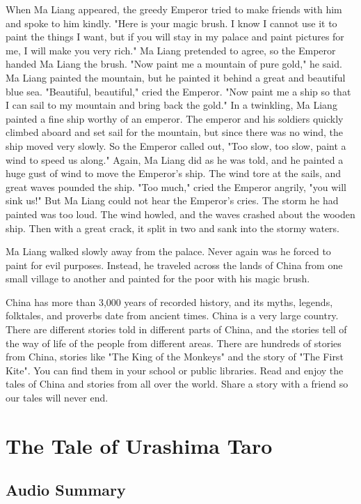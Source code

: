 When Ma Liang appeared, the greedy Emperor tried to make friends with him and spoke to him kindly. "Here is your magic brush. I know I cannot use it to paint the things I want, but if you will stay in my palace and paint pictures for me, I will make you very rich." Ma Liang pretended to agree, so the Emperor handed Ma Liang the brush. "Now paint me a mountain of pure gold," he said. Ma Liang painted the mountain, but he painted it behind a great and beautiful blue sea. "Beautiful, beautiful," cried the Emperor. "Now paint me a ship so that I can sail to my mountain and bring back the gold." In a twinkling, Ma Liang painted a fine ship worthy of an emperor. The emperor and his soldiers quickly climbed aboard and set sail for the mountain, but since there was no wind, the ship moved very slowly. So the Emperor called out, "Too slow, too slow, paint a wind to speed us along." Again, Ma Liang did as he was told, and he painted a huge gust of wind to move the Emperor's ship. The wind tore at the sails, and great waves pounded the ship. "Too much," cried the Emperor angrily, "you will sink us!" But Ma Liang could not hear the Emperor's cries. The storm he had painted was too loud. The wind howled, and the waves crashed about the wooden ship. Then with a great crack, it split in two and sank into the stormy waters.

Ma Liang walked slowly away from the palace. Never again was he forced to paint for evil purposes. Instead, he traveled across the lands of China from one small village to another and painted for the poor with his magic brush.

China has more than 3,000 years of recorded history, and its myths, legends, folktales, and proverbs date from ancient times. China is a very large country. There are different stories told in different parts of China, and the stories tell of the way of life of the people from different areas. There are hundreds of stories from China, stories like "The King of the Monkeys" and the story of "The First Kite". You can find them in your school or public libraries. Read and enjoy the tales of China and stories from all over the world. Share a story with a friend so our tales will never end.

\section{The Tale of Urashima Taro}

\subsection{Audio Summary}

